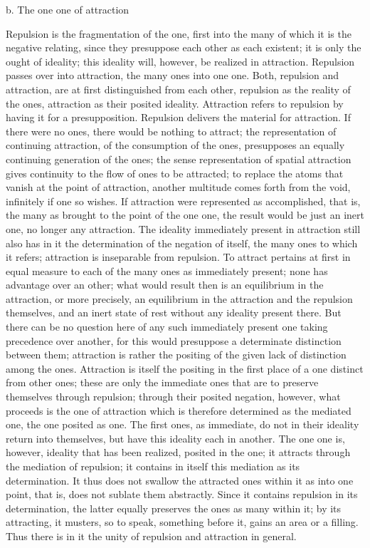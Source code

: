 b. The one one of attraction

Repulsion is the fragmentation of the one, first into the many of which it
is the negative relating, since they presuppose each other as each existent;
it is only the ought of ideality; this ideality will, however, be realized in
attraction. Repulsion passes over into attraction, the many ones into one
one. Both, repulsion and attraction, are at first distinguished from each
other, repulsion as the reality of the ones, attraction as their posited ideality.
Attraction refers to repulsion by having it for a presupposition. Repulsion
delivers the material for attraction. If there were no ones, there would
be nothing to attract; the representation of continuing attraction, of the
consumption of the ones, presupposes an equally continuing generation
of the ones; the sense representation of spatial attraction gives continuity
to the flow of ones to be attracted; to replace the atoms that vanish at the
point of attraction, another multitude comes forth from the void, infinitely
if one so wishes. If attraction were represented as accomplished, that is,
the many as brought to the point of the one one, the result would be just
an inert one, no longer any attraction. The ideality immediately present in
attraction still also has in it the determination of the negation of itself, the
many ones to which it refers; attraction is inseparable from repulsion.
To attract pertains at first in equal measure to each of the many ones as
immediately present; none has advantage over an other; what would result
then is an equilibrium in the attraction, or more precisely, an equilibrium
in the attraction and the repulsion themselves, and an inert state of rest
without any ideality present there. But there can be no question here of
any such immediately present one taking precedence over another, for
this would presuppose a determinate distinction between them; attraction
is rather the positing of the given lack of distinction among the ones.
Attraction is itself the positing in the first place of a one distinct from other
ones; these are only the immediate ones that are to preserve themselves
through repulsion; through their posited negation, however, what proceeds
is the one of attraction which is therefore determined as the mediated one,
the one posited as one. The first ones, as immediate, do not in their ideality
return into themselves, but have this ideality each in another.
The one one is, however, ideality that has been realized, posited in the
one; it attracts through the mediation of repulsion; it contains in itself this
mediation as its determination. It thus does not swallow the attracted ones
within it as into one point, that is, does not sublate them abstractly. Since
it contains repulsion in its determination, the latter equally preserves the
ones as many within it; by its attracting, it musters, so to speak, something
before it, gains an area or a filling. Thus there is in it the unity of repulsion
and attraction in general.

